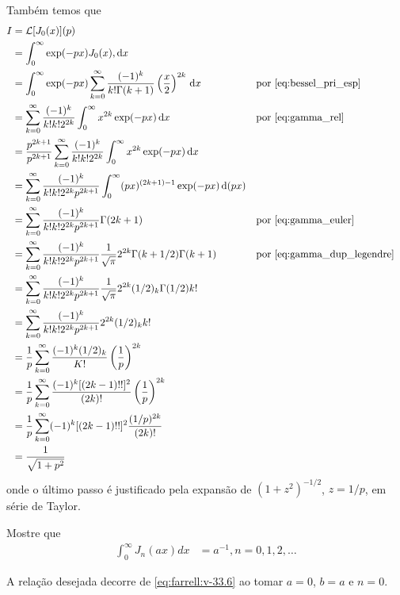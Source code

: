 \documentclass[a4paper,12pt, leqno, answers]{exam}
\begin{document}
\begin{questions}
\begin{solution}
        Tamb\'{e}m temos que
        \begin{align*}
            I &= \mathcal{L}[J_0(x)](p) \\
            &= \int_0^\infty \exp(-p x) J_0(x) ,\mathrm{d}x \\
            &= \int_0^\infty \exp(-p x) \sum_{k = 0}^\infty \frac{(-1)^k}{k! \Gamma(k + 1)} \left( \frac{x}{2} \right)^{2k} \,\mathrm{d}x && \text{por \eqref{eq:bessel_pri_esp}} \\
            &= \sum_{k = 0}^\infty \frac{(-1)^k}{k! k! 2^{2k}} \int_0^\infty x^{2k} \exp(-p x) \,\mathrm{d}x && \text{por \eqref{eq:gamma_rel}} \\
            &= \frac{p^{2k + 1}}{p^{2k + 1}} \sum_{k = 0}^\infty \frac{(-1)^k}{k! k! 2^{2k}} \int_0^\infty x^{2k} \exp(-p x) \,\mathrm{d}x \\
            &= \sum_{k = 0}^\infty \frac{(-1)^k}{k! k! 2^{2k} p^{2k + 1}} \int_0^\infty (px)^{(2k + 1) - 1} \exp(-p x) \,\mathrm{d}(px) \\
            &= \sum_{k = 0}^\infty \frac{(-1)^k}{k! k! 2^{2k} p^{2k + 1}} \Gamma(2 k + 1) && \text{por \eqref{eq:gamma_euler}} \\
            &= \sum_{k = 0}^\infty \frac{(-1)^k}{k! k! 2^{2k} p^{2k + 1}} \frac{1}{\sqrt{\pi}} 2^{2k} \Gamma(k + 1/2) \Gamma(k + 1) && \text{por \eqref{eq:gamma_dup_legendre}} \\
            &= \sum_{k = 0}^\infty \frac{(-1)^k}{k! k! 2^{2k} p^{2k + 1}} \frac{1}{\sqrt{\pi}} 2^{2k} (1/2)_k \Gamma(1/2) k! \\
            &= \sum_{k = 0}^\infty \frac{(-1)^k}{k! k! 2^{2k} p^{2k + 1}} 2^{2k} (1/2)_k k! \\
            &= \frac{1}{p} \sum_{k = 0}^\infty \frac{(-1)^k (1/2)_k}{K!} \left( \frac{1}{p} \right)^{2k} \\
            &= \frac{1}{p} \sum_{k = 0}^\infty \frac{(-1)^k [(2k - 1)!!]^2}{(2k)!} \left( \frac{1}{p} \right)^{2k} \\
            &= \frac{1}{p} \sum_{k = 0}^\infty (-1)^k [(2k - 1)!!]^2 \frac{(1/p)^{2k}}{(2k)!} \\
            &= \frac{1}{\sqrt{1 + p^2}}
        \end{align*}
        onde o \'{u}ltimo passo \'{e} justificado pela expans\~{a}o de $(1 + z^2)^{-1/2}$, $z = 1/p$, em s\'{e}rie de Taylor.
    \end{solution}

    \question Mostre que
    \begin{align*}
        \int_0^\infty J_n(ax) dx &= a^{-1}, n = 0, 1, 2, \ldots
    \end{align*}
    \begin{solution}
        A rela\c{c}\~{a}o desejada decorre de \eqref{eq:farrell:v-33.6} ao tomar $a = 0$, $b = a$ e $n = 0$.


\end{solution}
\end{questions}
\end{document}
